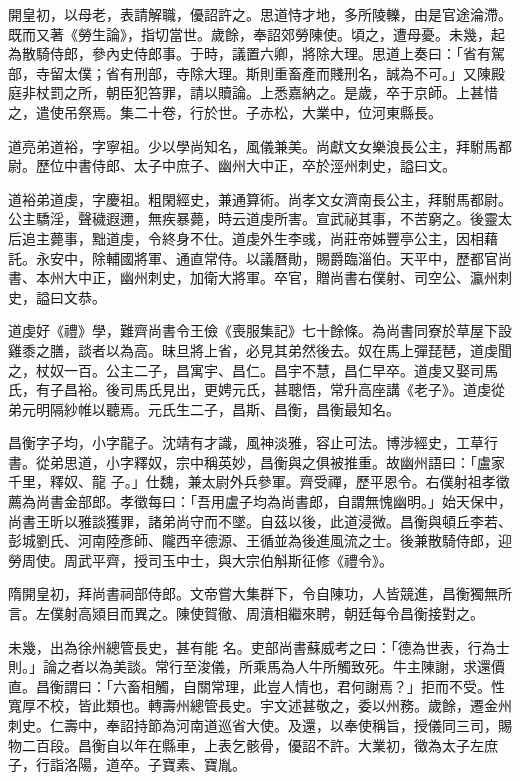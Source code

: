 \begin{pinyinscope}
 開皇初，以母老，表請解職，優詔許之。思道恃才地，多所陵轢，由是官途淪滯。既而又著《勞生論》，指切當世。歲餘，奉詔郊勞陳使。頃之，遭母憂。未幾，起為散騎侍郎，參內史侍郎事。于時，議置六卿，將除大理。思道上奏曰：「省有駕部，寺留太僕；省有刑部，寺除大理。斯則重畜產而賤刑名，誠為不可。」又陳殿庭非杖罰之所，朝臣犯笞罪，請以贖論。上悉嘉納之。是歲，卒于京師。上甚惜之，遣使吊祭焉。集二十卷，行於世。子赤松，大業中，位河東縣長。



 道亮弟道裕，字寧祖。少以學尚知名，風儀兼美。尚獻文女樂浪長公主，拜駙馬都尉。歷位中書侍郎、太子中庶子、幽州大中正，卒於涇州刺史，謚曰文。



 道裕弟道虔，字慶祖。粗閑經史，兼通算術。尚孝文女濟南長公主，拜駙馬都尉。公主驕淫，聲穢遐邇，無疾暴薨，時云道虔所害。宣武祕其事，不苦窮之。後靈太后追主薨事，黜道虔，令終身不仕。道虔外生李彧，尚莊帝姊豐亭公主，因相藉託。永安中，除輔國將軍、通直常侍。以議曆勛，賜爵臨淄伯。天平中，歷都官尚書、本州大中正，幽州刺史，加衛大將軍。卒官，贈尚書右僕射、司空公、瀛州刺史，謚曰文恭。



 道虔好《禮》學，難齊尚書令王儉《喪服集記》七十餘條。為尚書同寮於草屋下設雞黍之膳，談者以為高。昧旦將上省，必見其弟然後去。奴在馬上彈琵琶，道虔聞之，杖奴一百。公主二子，昌寓宇、昌仁。昌宇不慧，昌仁早卒。道虔又娶司馬氏，有子昌裕。後司馬氏見出，更娉元氏，甚聰悟，常升高座講《老子》。道虔從弟元明隔紗帷以聽焉。元氏生二子，昌斯、昌衡，昌衡最知名。



 昌衡字子均，小字龍子。沈靖有才識，風神淡雅，容止可法。博涉經史，工草行書。從弟思道，小字釋奴，宗中稱英妙，昌衡與之俱被推重。故幽州語曰：「盧家千里，釋奴、龍
 子。」仕魏，兼太尉外兵參軍。齊受禪，歷平恩令。右僕射祖孝徵薦為尚書金部郎。孝徵每曰：「吾用盧子均為尚書郎，自謂無愧幽明。」始天保中，尚書王昕以雅談獲罪，諸弟尚守而不墜。自茲以後，此道浸微。昌衡與頓丘李若、彭城劉氏、河南陸彥師、隴西辛德源、王循並為後進風流之士。後兼散騎侍郎，迎勞周使。周武平齊，授司玉中士，與大宗伯斛斯征修《禮令》。



 隋開皇初，拜尚書祠部侍郎。文帝嘗大集群下，令自陳功，人皆競進，昌衡獨無所言。左僕射高熲目而異之。陳使賀徹、周濆相繼來聘，朝廷每令昌衡接對之。



 未幾，出為徐州總管長史，甚有能
 名。吏部尚書蘇威考之曰：「德為世表，行為士則。」論之者以為美談。常行至浚儀，所乘馬為人牛所觸致死。牛主陳謝，求還價直。昌衡謂曰：「六畜相觸，自關常理，此豈人情也，君何謝焉？」拒而不受。性寬厚不校，皆此類也。轉壽州總管長史。宇文述甚敬之，委以州務。歲餘，遷金州刺史。仁壽中，奉詔持節為河南道巡省大使。及還，以奉使稱旨，授儀同三司，賜物二百段。昌衡自以年在縣車，上表乞骸骨，優詔不許。大業初，徵為太子左庶子，行詣洛陽，道卒。子寶素、寶胤。




\end{pinyinscope}

